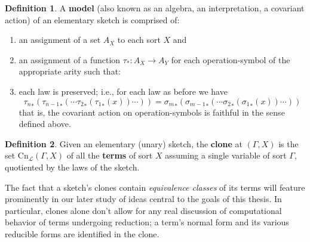 \documentclass[12pt,twoside]{reedthesis}
\theoremstyle{definition}
\newtheorem{definition}{Definition}
\newtheorem{example}{Example}
\theoremstyle{remark}
\theoremstyle{theorem}
\begin{document}
  \begin{definition}\label{def:model}
    A \textbf{model} (also known as an algebra, an interpretation, a covariant
    action) of an elementary sketch is comprised of:
    \begin{enumerate}
      \item an assignment of a set $A_X$ to each sort $X$ and
      \item an assignment of a function $\tau_* : A_X \rightarrow A_Y$ for each
            operation-symbol of the appropriate arity such that:
      \item each law is preserved; i.e., for each law as before we have
            \[ {\tau_n}_* ({\tau_{n-1}}_* (\cdots {\tau_2}_* ({\tau_1}_* (x))\cdots )) = {\sigma_m}_* ({\sigma_{m-1}}_*(\cdots {\sigma_2}_* ({\sigma_1}_* (x))\cdots )) \]
            that is, the covariant action on operation-symbols is faithful in
            the sense defined above.
    \end{enumerate}
  \end{definition}

  \begin{definition}\label{def:clone}
    Given an elementary (unary) sketch, the \textbf{clone} at \( (\Gamma, X) \) is
    the set \( \text{Cn}_\mathcal{L} (\Gamma, X) \) of all the \textbf{terms} of sort
    $X$ assuming a single variable of sort $\Gamma$, quotiented by the laws of the
    sketch.
  \end{definition}
  The fact that a sketch's clones contain \emph{equivalence classes} of its
  terms will feature prominently in our later study of ideas central to the
  goals of this thesis. In particular, clones alone don't allow for any real
  discussion of computational behavior of terms undergoing reduction; a term's
  normal form and its various reducible forms are identified in the clone.
\end{document}
